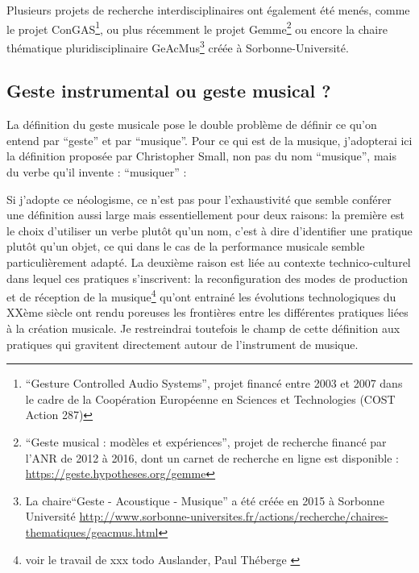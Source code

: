 Plusieurs projets de recherche interdisciplinaires ont également été menés, comme le projet ConGAS\footnote{``Gesture Controlled Audio Systems'', projet financé entre 2003 et 2007 dans le cadre de la Coopération Européenne en Sciences et Technologies (COST Action 287)}, ou plus récemment le projet Gemme\footnote{``Geste musical : modèles et expériences'', projet de recherche financé par l'ANR de 2012 à 2016, dont un carnet de recherche en ligne est disponible : \url{https://geste.hypotheses.org/gemme}} ou encore la chaire thématique pluridisciplinaire GeAcMus\footnote{La chaire``Geste - Acoustique - Musique'' a été créée en 2015 à Sorbonne Université \url{http://www.sorbonne-universites.fr/actions/recherche/chaires-thematiques/geacmus.html}} créée à Sorbonne-Université.



\subsection{Geste instrumental ou geste musical ?}

La définition du geste musicale pose le double problème de définir ce qu'on entend par ``geste'' et par ``musique''. Pour ce qui est de la musique, j'adopterai ici la définition proposée par Christopher Small, non pas du nom ``musique'', mais du verbe qu'il invente : ``musiquer'' \cite{small_musicking:_1998}:


Si j'adopte ce néologisme, ce n'est pas pour l'exhaustivité que semble conférer une définition aussi large mais essentiellement pour deux raisons: la première est le choix d'utiliser un verbe plutôt qu'un nom, c'est à dire d'identifier une pratique plutôt qu'un objet, ce qui dans le cas de la performance musicale semble particulièrement adapté. La deuxième raison est liée au contexte technico-culturel dans lequel ces pratiques s'inscrivent: la reconfiguration des modes de production et de réception de la musique\footnote{voir le travail de xxx todo Auslander, Paul Théberge \cite{theberge_any_1997}} qu'ont entrainé les évolutions technologiques du XXème siècle ont rendu poreuses les frontières entre les différentes pratiques liées à la création musicale. Je restreindrai toutefois le champ de cette définition aux pratiques qui gravitent directement autour de l'instrument de musique.

